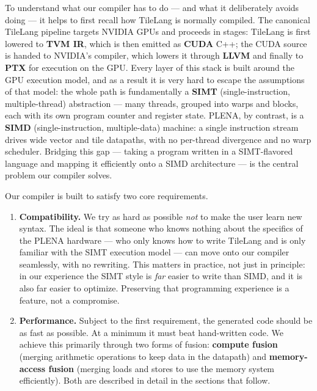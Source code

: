 \documentclass[
  10pt,
]{article}
\begin{document}
To understand what our compiler has to do --- and what it deliberately
avoids doing --- it helps to first recall how TileLang is normally
compiled. The canonical TileLang pipeline targets NVIDIA GPUs and
proceeds in stages: TileLang is first lowered to \textbf{TVM IR}, which
is then emitted as \textbf{CUDA} C++; the CUDA source is handed to
NVIDIA's compiler, which lowers it through \textbf{LLVM} and finally to
\textbf{PTX} for execution on the GPU. Every layer of this stack is
built around the GPU execution model, and as a result it is very hard to
escape the assumptions of that model: the whole path is fundamentally a
\textbf{SIMT} (single-instruction, multiple-thread) abstraction ---
many threads, grouped into warps and blocks, each with its own program
counter and register state. PLENA, by contrast, is a \textbf{SIMD}
(single-instruction, multiple-data) machine: a single instruction stream
drives wide vector and tile datapaths, with no per-thread divergence and
no warp scheduler. Bridging this gap --- taking a program written in a
SIMT-flavored language and mapping it efficiently onto a SIMD
architecture --- is the central problem our compiler solves.

Our compiler is built to satisfy two core requirements.

\begin{enumerate}
\def\labelenumi{\arabic{enumi}.}
\item
  \textbf{Compatibility.} We try as hard as possible \emph{not} to make
  the user learn new syntax. The ideal is that someone who knows nothing
  about the specifics of the PLENA hardware --- who only knows how to
  write TileLang and is only familiar with the SIMT execution model ---
  can move onto our compiler seamlessly, with no rewriting. This matters
  in practice, not just in principle: in our experience the SIMT style is
  \emph{far} easier to write than SIMD, and it is also far easier to
  optimize. Preserving that programming experience is a feature, not a
  compromise.
\item
  \textbf{Performance.} Subject to the first requirement, the generated
  code should be as fast as possible. At a minimum it must beat
  hand-written code. We achieve this primarily through two forms of
  fusion: \textbf{compute fusion} (merging arithmetic operations to keep
  data in the datapath) and \textbf{memory-access fusion} (merging loads
  and stores to use the memory system efficiently). Both are described in
  detail in the sections that follow.
\end{enumerate}
\end{document}

